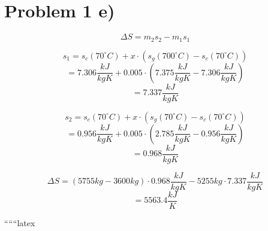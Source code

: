 \section*{Problem 1 e)}

\[
\Delta S = m_2 s_2 - m_1 s_1
\]

\[
s_1 = s_c (70^\circ C) + x \cdot (s_g (700^\circ C) - s_c (70^\circ C))
\]
\[
= 7.306 \frac{kJ}{kgK} + 0.005 \cdot (7.375 \frac{kJ}{kgK} - 7.306 \frac{kJ}{kgK})
\]
\[
= 7.337 \frac{kJ}{kgK}
\]

\[
s_2 = s_c (70^\circ C) + x \cdot (s_g (70^\circ C) - s_c (70^\circ C))
\]
\[
= 0.956 \frac{kJ}{kgK} + 0.005 \cdot (2.785 \frac{kJ}{kgK} - 0.956 \frac{kJ}{kgK})
\]
\[
= 0.968 \frac{kJ}{kgK}
\]

\[
\Delta S = (5755 kg - 3600 kg) \cdot 0.968 \frac{kJ}{kgK} - 5255 kg \cdot 7.337 \frac{kJ}{kgK}
\]
\[
= 5563.4 \frac{kJ}{K}
\]

``````latex